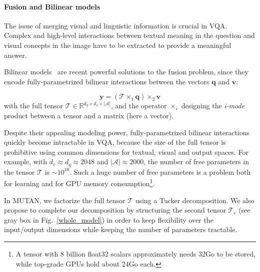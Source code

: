 \documentclass[10pt,twocolumn,letterpaper]{article}
\newcommand{\tens}[1]{
\bm{\mathcal{#1}}
}
\newcommand{\q}{\mathbf{q}}
\newcommand{\vv}{\mathbf{v}}
\newcommand{\y}{\mathbf{y}}
\begin{document}
\paragraph{Fusion and Bilinear models}
The issue of merging visual and linguistic information is crucial in VQA. Complex and 
high-level interactions between textual meaning in the question and visual concepts in the image have to be extracted to provide a meaningful answer. 

Bilinear models~\cite{fukui16mcb,Kim2017} are recent powerful solutions to the fusion problem, since they encode fully-parametrized bilinear interactions between the vectors $\q$ and $\vv$: 

\begin{equation}
 \label{bilinear} 
\y = \left( \tens{T} \times_1  \q \right) \times_2  \vv
\end{equation}
with the full tensor $\tens{T} \in \mathbb{R}^{d_q \times d_v \times |\mathcal{A}|}$, and the operator $\times_i$ designing the \emph{i-mode} product between a tensor and a matrix (here a vector). 

Despite their appealing modeling power, fully-parametrized bilinear interactions quickly become intractable in VQA, because the size of the full tensor is  
prohibitive using common dimensions for textual, visual and output spaces. 
For example, with $d_v \approx d_q \approx 2048$ and $|\mathcal{A}| \approx 2000$, the number of free parameters in the tensor $\tens{T}$ is $\sim 10^{10}$.
Such a huge number of free parameters is a problem both for learning and for GPU memory consumption\footnote{A tensor with 8 billion float32 scalars approximately needs 32Go to be stored, while top-grade GPUs hold about 24Go each.}. 

 In MUTAN, we factorize the full tensor $\tens{T}$ using a Tucker decomposition. 
We also propose to complete our decomposition by structuring the second tensor $\tens{T}_c$ (see gray box in Fig.~\ref{whole_model}) in order to keep flexibility over the input/output dimensions while keeping the number of parameters tractable.

\label{bilinear_pb}
\end{document}

